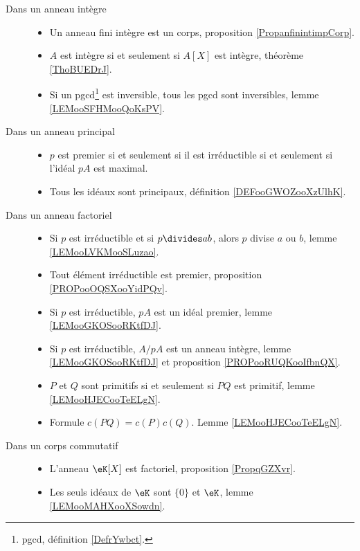 \begin{description}
	\item[Dans un anneau intègre]\hspace{1cm}
	\begin{itemize}
		\item
		      Un anneau fini intègre est un corps, proposition \ref{PropanfinintimpCorp}.
		\item
		      \( A\) est intègre si et seulement si \( A[X]\) est intègre, théorème \ref{ThoBUEDrJ}.
		\item
		      Si un pgcd\footnote{pgcd, définition \ref{DefrYwbct}.} est inversible, tous les pgcd sont inversibles, lemme \ref{LEMooSFHMooQoKsPV}.
	\end{itemize}
	\item[Dans un anneau principal]\hspace{1cm}
	\begin{itemize}
		\item
		      \( p\) est premier si et seulement si il est irréductible si et seulement si l'idéal \( pA\) est maximal.
		\item
		      Tous les idéaux sont principaux, définition \ref{DEFooGWOZooXzUlhK}.
	\end{itemize}
	\item[Dans un anneau factoriel]\hspace{1cm}
	\begin{itemize}
		\item
		      Si \( p\) est irréductible et si \( p\divides ab\), alors \( p\) divise \( a\) ou \( b\), lemme \ref{LEMooLVKMooSLuzao}.
		\item
		      Tout élément irréductible est premier, proposition \ref{PROPooOQSXooYidPQv}.
		\item
		      Si \( p\) est irréductible, \( pA\) est un idéal premier, lemme \ref{LEMooGKOSooRKtfDJ}.
		\item
		      Si \( p\) est irréductible, \( A/pA\) est un anneau intègre, lemme \ref{LEMooGKOSooRKtfDJ} et proposition \ref{PROPooRUQKooIfbnQX}.
		\item
		      \( P\) et \( Q\) sont primitifs si et seulement si \( PQ\) est primitif, lemme \ref{LEMooHJECooTeELgN}.
		\item
		      Formule \( c(PQ)=c(P)c(Q)\). Lemme \ref{LEMooHJECooTeELgN}.
	\end{itemize}
	\item[Dans un corps commutatif]\hspace{1cm}
	\begin{itemize}
		\item
		      L'anneau \( \eK[X]\) est factoriel, proposition \ref{PropqGZXvr}.
		\item
		      Les seuls idéaux de \( \eK\) sont \( \{ 0 \}\) et \( \eK\), lemme \ref{LEMooMAHXooXSowdn}.
	\end{itemize}
\end{description}


